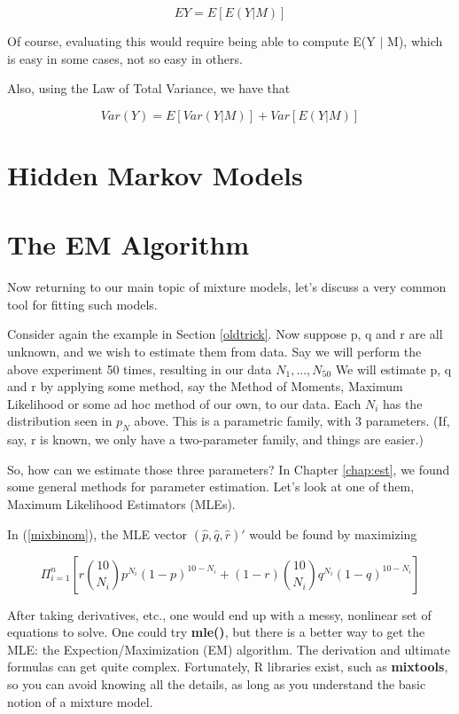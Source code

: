 \documentclass[11pt]{article}
\begin{document}
\begin{equation}
\label{mixmean}
EY = E[E(Y | M)]
\end{equation}

Of course, evaluating this would require being able to compute E(Y $|$
M), which is easy in some cases, not so easy in others.

Also, using the Law of Total Variance, we have that

\begin{equation}
\label{mixvar}
Var(Y) = E[Var(Y|M)] + Var[E(Y|M)]
\end{equation}

\section{Hidden Markov Models}

\section{The EM Algorithm}
\label{emalg}

Now returning to our main topic of mixture models, let's discuss a very
common tool for fitting such models.

Consider again the example in Section \ref{oldtrick}.  Now suppose p, q
and r are all unknown, and we wish to estimate them from data. Say we
will perform the above experiment 50 times, resulting in our data
$N_1,...,N_{50}$ We will estimate p, q and r by applying some method,
say the Method of Moments, Maximum Likelihood or some ad hoc method of
our own, to our data. Each $N_i$ has the distribution seen in $p_N$
above. This is a parametric family, with 3 parameters. (If, say, r is
known, we only have a two-parameter family, and things are easier.)

So, how can we estimate those three parameters?  In Chapter
\ref{chap:est}, we found some general methods for parameter estimation.
Let's look at one of them, Maximum Likelihood Estimators (MLEs).

In (\ref{mixbinom}), the MLE vector 
$(\widehat{p},
  \widehat{q},
  \widehat{r})'$
would be found by maximizing

\begin{equation}
\Pi_{i=1}^n
\left [ r \binom{10}{N_i} p^{N_i} (1-p)^{10-N_i} +
(1-r) \binom{10}{N_i} q^{N_i} (1-q)^{10-N_i}
\right ]
\end{equation}

After taking derivatives, etc., one would end up with a messy, nonlinear
set of equations to solve.  One could try {\bf mle()}, but there is a
better way to get the MLE: the Expection/Maximization (EM) algorithm.
The derivation and ultimate formulas can get quite complex.
Fortunately, R libraries exist, such as {\bf mixtools}, so you can avoid
knowing all the details, as long as you understand the basic notion of a
mixture model.  
\end{document}
